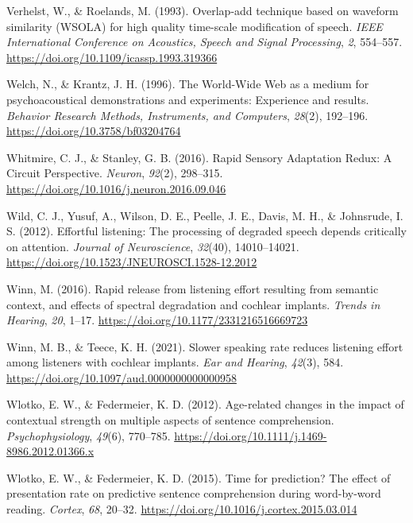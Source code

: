 \documentclass[a4paper, nobind]{templates/ociamthesis}
\newlength{\cslhangindent}
\newenvironment{CSLReferences}[2] %
 {%
  \setlength{\parindent}{0pt}
  \ifodd #1
  \let\oldpar\par
  \def\par{\hangindent=\cslhangindent\oldpar}
  \fi
  \setlength{\parskip}{1mm}
  \setlength{\baselineskip}{6mm}
 }%
 {}
\begin{document}
\begin{CSLReferences}{1}{0}
\leavevmode{}%
Verhelst, W., \& Roelands, M. (1993). {Overlap-add technique based on waveform similarity (WSOLA) for high quality time-scale modification of speech}. \emph{IEEE International Conference on Acoustics, Speech and Signal Processing}, \emph{2}, 554--557. \url{https://doi.org/10.1109/icassp.1993.319366}

\leavevmode{}%
Welch, N., \& Krantz, J. H. (1996). {The World-Wide Web as a medium for psychoacoustical demonstrations and experiments: Experience and results}. \emph{Behavior Research Methods, Instruments, and Computers}, \emph{28}(2), 192--196. \url{https://doi.org/10.3758/bf03204764}

\leavevmode{}%
Whitmire, C. J., \& Stanley, G. B. (2016). {Rapid Sensory Adaptation Redux: A Circuit Perspective}. \emph{Neuron}, \emph{92}(2), 298--315. \url{https://doi.org/10.1016/j.neuron.2016.09.046}

\leavevmode{}%
Wild, C. J., Yusuf, A., Wilson, D. E., Peelle, J. E., Davis, M. H., \& Johnsrude, I. S. (2012). {Effortful listening: The processing of degraded speech depends critically on attention}. \emph{Journal of Neuroscience}, \emph{32}(40), 14010--14021. \url{https://doi.org/10.1523/JNEUROSCI.1528-12.2012}

\leavevmode{}%
Winn, M. (2016). Rapid release from listening effort resulting from semantic context, and effects of spectral degradation and cochlear implants. \emph{Trends in Hearing}, \emph{20}, 1--17. \url{https://doi.org/10.1177/2331216516669723}

\leavevmode{}%
Winn, M. B., \& Teece, K. H. (2021). {Slower speaking rate reduces listening effort among listeners with cochlear implants}. \emph{Ear and Hearing}, \emph{42}(3), 584. \url{https://doi.org/10.1097/aud.0000000000000958}

\leavevmode{}%
Wlotko, E. W., \& Federmeier, K. D. (2012). Age-related changes in the impact of contextual strength on multiple aspects of sentence comprehension. \emph{Psychophysiology}, \emph{49}(6), 770--785. \url{https://doi.org/10.1111/j.1469-8986.2012.01366.x}

\leavevmode{}%
Wlotko, E. W., \& Federmeier, K. D. (2015). {Time for prediction? The effect of presentation rate on predictive sentence comprehension during word-by-word reading}. \emph{Cortex}, \emph{68}, 20--32. \url{https://doi.org/10.1016/j.cortex.2015.03.014}


\end{CSLReferences}
\end{document}
